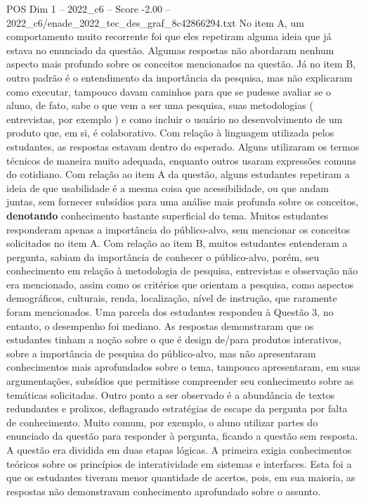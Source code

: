 \begin{textsample}{POS Dim 1 – 2022\_c6 – Score -2.00 – 2022\_c6/enade\_2022\_tec\_des\_graf\_8c42866294.txt}
No item A, um comportamento muito recorrente foi que eles repetiram alguma ideia que já estava no enunciado da questão.
Algumas respostas não abordaram nenhum aspecto mais profundo sobre os conceitos mencionados na questão.
Já no item B, outro padrão é o entendimento da importância da pesquisa, mas não explicaram como executar, tampouco davam caminhos para que se pudesse avaliar se o aluno, de fato, sabe o que vem a ser uma pesquisa, suas metodologias ( entrevistas, por exemplo ) e como incluir o usuário no desenvolvimento de um produto que, em si, é colaborativo.
Com relação à linguagem utilizada pelos estudantes, as respostas estavam dentro do esperado.
Alguns utilizaram os termos técnicos de maneira muito adequada, enquanto outros usaram expressões comuns do cotidiano.
Com relação ao item A da questão, alguns estudantes repetiram a ideia de que usabilidade é a mesma coisa que acessibilidade, ou que andam juntas, sem fornecer subsídios para uma análise mais profunda sobre os conceitos, \textbf{denotando} conhecimento bastante superficial do tema.
Muitos estudantes responderam apenas a importância do público-alvo, sem mencionar os conceitos solicitados no item A.
Com relação ao item B, muitos estudantes entenderam a pergunta, sabiam da importância de conhecer o público-alvo, porém, seu conhecimento em relação à metodologia de pesquisa, entrevistas e observação não era mencionado, assim como os critérios que orientam a pesquisa, como aspectos demográficos, culturais, renda, localização, nível de instrução, que raramente foram mencionados.
Uma parcela dos estudantes respondeu à Questão 3, no entanto, o desempenho foi mediano.
As respostas demonstraram que os estudantes tinham a noção sobre o que é design de/para produtos interativos, sobre a importância de pesquisa do público-alvo, mas não apresentaram conhecimentos mais aprofundados sobre o tema, tampouco apresentaram, em suas argumentações, subsídios que permitisse compreender seu conhecimento sobre as temáticas solicitadas.
Outro ponto a ser observado é a abundância de textos redundantes e prolixos, deflagrando estratégias de escape da pergunta por falta de conhecimento.
Muito comum, por exemplo, o aluno utilizar partes do enunciado da questão para responder à pergunta, ficando a questão sem resposta.
A questão era dividida em duas etapas lógicas.
A primeira exigia conhecimentos teóricos sobre os princípios de interatividade em sistemas e interfaces.
Esta foi a que os estudantes tiveram menor quantidade de acertos, pois, em sua maioria, as respostas não demonstravam conhecimento aprofundado sobre o assunto.

\end{textsample}
